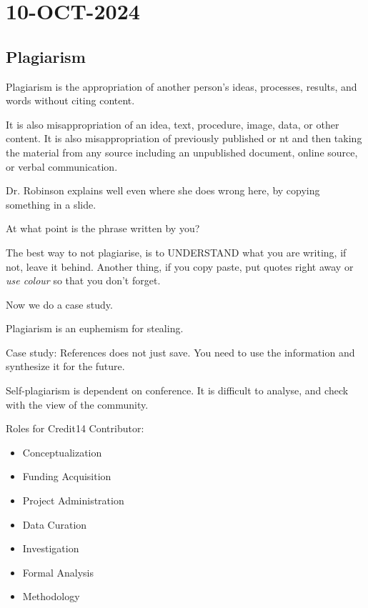 \documentclass[10pt, oneside]{article}
\begin{document}
\section{10-OCT-2024}
\subsection{Plagiarism}
Plagiarism is the appropriation of another person's ideas, processes, results, and words without citing content.

It is also misappropriation of an idea, text, procedure, image, data, or other content. It is also misappropriation of previously published or nt and then taking the material from any source including an unpublished document, online source, or verbal communication.

Dr. Robinson explains well even where she does wrong here, by copying something in a slide. 

At what point is the phrase written by you?

The best way to not plagiarise, is to UNDERSTAND what you are writing, if not, leave it behind. Another thing, if you copy paste, put quotes right away or \textit{use colour} so that you don't forget. 

Now we do a case study. 


Plagiarism is an euphemism for stealing. 

Case study: References does not just save. You need to use the information and synthesize it for the future. 

Self-plagiarism is dependent on conference. It is difficult to analyse, and check with the view of the community. 

Roles for Credit14 Contributor:

\begin{itemize}
    \item Conceptualization
    \item Funding Acquisition
    \item Project Administration
    \item Data Curation
    \item Investigation
    \item Formal Analysis
    \item Methodology
\end{itemize}
\end{document}
